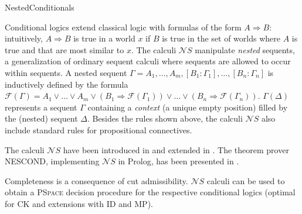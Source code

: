 \begin{entry}{NestedConditionals}
 \begin{clarifications}
Conditional logics extend classical logic with formulas of the form $A \Rightarrow B$: intuitively, $A \Rightarrow B$ is true in a world $x$ if $B$ is true in the set of worlds where $A$ is true and that are most similar to $x$. The calculi $\mathcal{N}S$ manipulate \emph{nested} sequents, a generalization of ordinary sequent calculi where sequents are allowed to occur within sequents. A nested sequent $\Gamma = A_1, \dots, A_m, [B_1: \Gamma_1], \dots, [B_n: \Gamma_n]$ is inductively defined by the formula $\mathcal{F}(\Gamma)=A_1 \vee \dots \vee A_m \vee (B_1 \Rightarrow \mathcal{F}(\Gamma_1)) \vee \dots \vee (B_n \Rightarrow \mathcal{F}(\Gamma_n)).$ $\Gamma(\Delta)$ represents a sequent $\Gamma$ containing a \emph{context} (a unique empty position) filled by the (nested) sequent $\Delta$.
  Besides the rules shown above, the calculi $\mathcal{N}S$ also include standard 
   rules for propositional connectives.
 \end{clarifications}

 \begin{history}
  The calculi $\mathcal{N}S$ have been introduced in 
  \cite{jelia2012pozz} and extended  in \cite{jlcpozz}. The theorem prover NESCOND, implementing $\mathcal{N}S$ in Prolog, has been presented in \cite{ijcarpozz}.
 \end{history}

 \begin{technicalities}
Completeness is a consequence of cut admissibility. $\mathcal{N}S$ calculi  can be used to obtain a \textsc{PSpace} decision procedure for the respective conditional logics (optimal for CK and extensions with ID and MP).
 \end{technicalities}













\end{entry}
